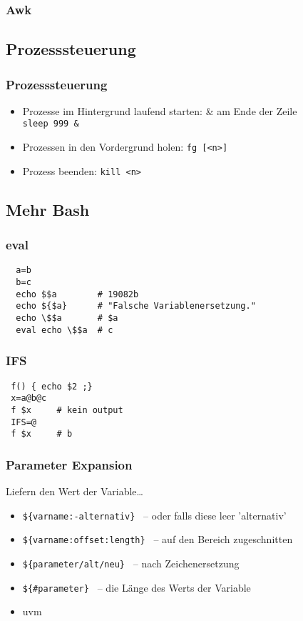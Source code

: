 \documentclass{beamer}
\begin{document}
\begin{frame}
 \frametitle{Awk}
\end{frame}

\subsection{Prozesssteuerung}
\begin{frame}
 \frametitle{Prozesssteuerung}
 \begin{itemize}
  \item Prozesse im Hintergrund laufend starten: \& am Ende der Zeile \\
    {\tt sleep 999 \& }
  \item Prozessen in den Vordergrund holen: {\tt fg [<n>] }
  \item Prozess beenden: {\tt kill <n>}
 \end{itemize}
\end{frame}

\subsection{Mehr Bash}
\begin{frame}[fragile]
 \frametitle{eval}
 \begin{lstlisting}
  a=b
  b=c
  echo $$a        # 19082b
  echo ${$a}      # "Falsche Variablenersetzung."
  echo \$$a       # $a
  eval echo \$$a  # c 
 \end{lstlisting}
\end{frame}

\begin{frame}[fragile]
 \frametitle{IFS}
 \begin{lstlisting}
 f() { echo $2 ;}
 x=a@b@c
 f $x     # kein output
 IFS=@
 f $x     # b
 \end{lstlisting}
\end{frame}

\begin{frame}
 \frametitle{Parameter Expansion}
 
 Liefern den Wert der Variable…
 \begin{itemize}
  \item {\tt \$\{varname:-alternativ\} } -- oder falls diese leer 'alternativ'
  \item {\tt \$\{varname:offset:length\} } -- auf den Bereich zugeschnitten
  \item {\tt \$\{parameter/alt/neu\} } -- nach Zeichenersetzung
  \item {\tt \$\{\#parameter\} } -- die Länge des Werts der Variable
  \item uvm
 \end{itemize}
\end{frame}
\end{document}
